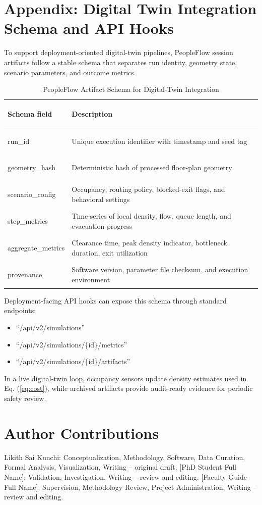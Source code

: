 \documentclass[utf8]{FrontiersinHarvard}
\begin{document}
\section{Appendix: Digital Twin Integration Schema and API Hooks}
To support deployment-oriented digital-twin pipelines, PeopleFlow session artifacts follow a stable schema that separates run identity, geometry state, scenario parameters, and outcome metrics.

\begin{table}[!htbp]
\centering
\caption{PeopleFlow Artifact Schema for Digital-Twin Integration}
\label{tab:dt_schema}
{\footnotesize
\setlength{\tabcolsep}{3pt}
\begin{tabular}{>{\bfseries\raggedright\arraybackslash}p{2.3cm} >{\raggedright\arraybackslash}p{4.4cm}}
\toprule
Schema field & Description \\
\midrule
run\_id & Unique execution identifier with timestamp and seed tag \\
geometry\_hash & Deterministic hash of processed floor-plan geometry \\
scenario\_config & Occupancy, routing policy, blocked-exit flags, and behavioral settings \\
step\_metrics & Time-series of local density, flow, queue length, and evacuation progress \\
aggregate\_metrics & Clearance time, peak density indicator, bottleneck duration, exit utilization \\
provenance & Software version, parameter file checksum, and execution environment \\
\bottomrule
\end{tabular}
}
\end{table}

Deployment-facing API hooks can expose this schema through standard endpoints:
\begin{itemize}
    \item ``/api/v2/simulations''
    \item ``/api/v2/simulations/\{id\}/metrics''
    \item ``/api/v2/simulations/\{id\}/artifacts''
\end{itemize}
In a live digital-twin loop, occupancy sensors update density estimates used in Eq. (\ref{eq:cost}), while archived artifacts provide audit-ready evidence for periodic safety review.


\section*{Author Contributions}
Likith Sai Kunchi: Conceptualization, Methodology, Software, Data Curation, Formal Analysis, Visualization, Writing -- original draft. [PhD Student Full Name]: Validation, Investigation, Writing -- review and editing. [Faculty Guide Full Name]: Supervision, Methodology Review, Project Administration, Writing -- review and editing.
\end{document}
